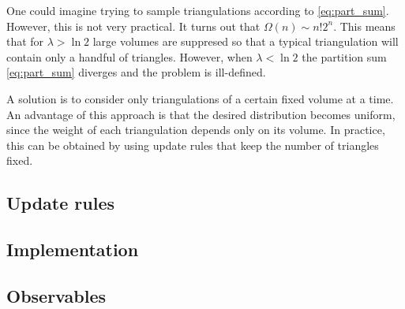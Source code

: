 One could imagine trying to sample triangulations according to \eqref{eq:part_sum}. However, this is not very practical. It turns out that $\Omega(n) \sim n! 2^n$. This means that for $\lambda > \ln 2$ large volumes are suppresed so that a typical triangulation will contain only a handful of triangles. However, when $\lambda < \ln 2$ the partition sum \eqref{eq:part_sum} diverges and the problem is ill-defined.

A solution is to consider only triangulations of a certain fixed volume at a time. An advantage of this approach is that the desired distribution becomes uniform, since the weight of each triangulation depends only on its volume. In practice, this can be obtained by using update rules that keep the number of triangles fixed.

\subsection{Update rules}

\subsection{Implementation}

\subsection{Observables}
